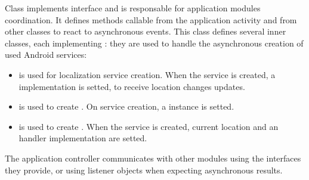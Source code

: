 Class  implements  interface and is responsable for application modules coordination. It defines methods callable from the application activity and from other classes to react to asynchronous events. This class defines several inner classes, each implementing : they are used to handle the asynchronous creation of used Android services:
	\begin{itemize}
		\item {} is used for localization service creation. When the service is created, a  implementation is setted, to receive location changes updates.  
		\item {} is used to create . On service creation, a  instance is setted.
		\item {} is used to create . When the service is created, current location and an handler implementation are setted.   
	\end{itemize}  
	
The application controller communicates with other modules using the interfaces they provide, or using listener objects when expecting asynchronous results.

